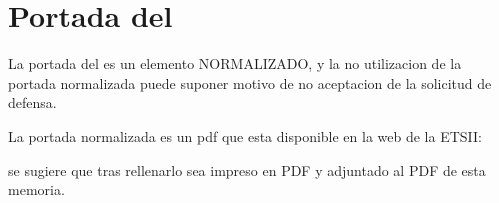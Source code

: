 

\chapter{Portada del \TF}


La portada del \TF es un elemento NORMALIZADO, y la no utilizacion de la portada normalizada puede suponer motivo de no aceptacion de la solicitud de defensa.

La portada normalizada es un pdf que esta disponible en la web de la ETSII: 

\texttt{\enlacedescargas}

se sugiere que tras rellenarlo sea impreso en PDF y adjuntado al PDF de esta memoria.


